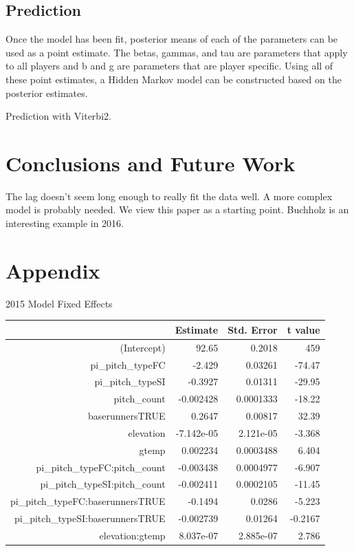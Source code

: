 \documentclass[letterpaper,12pt]{article}\usepackage[]{graphicx}\usepackage[]{color}
\begin{document}
\subsection{Prediction}
Once the model has been fit, posterior means of each of the parameters can be used as a point estimate.  The betas, gammas, and tau are parameters that apply to all players and b and g are parameters that are player specific.  Using all of these point estimates, a Hidden Markov model can be constructed based on the posterior estimates.  

Prediction with Viterbi2.  


\section{Conclusions and Future Work}
The lag doesn't seem long enough to really fit the data well.  A more complex model is probably needed.  We view this paper as a starting point.  Buchholz is an interesting example in 2016.  


\section*{Appendix}
2015 Model Fixed Effects
\begin{table}[ht]
\centering
\begin{tabular}{rrrr}
  \hline
 & Estimate & Std. Error & t value \\ 
  \hline
(Intercept) & 92.65 & 0.2018 &   459 \\ 
  pi\_pitch\_typeFC & -2.429 & 0.03261 & -74.47 \\ 
  pi\_pitch\_typeSI & -0.3927 & 0.01311 & -29.95 \\ 
  pitch\_count & -0.002428 & 0.0001333 & -18.22 \\ 
  baserunnersTRUE & 0.2647 & 0.00817 & 32.39 \\ 
  elevation & -7.142e-05 & 2.121e-05 & -3.368 \\ 
  gtemp & 0.002234 & 0.0003488 & 6.404 \\ 
  pi\_pitch\_typeFC:pitch\_count & -0.003438 & 0.0004977 & -6.907 \\ 
  pi\_pitch\_typeSI:pitch\_count & -0.002411 & 0.0002105 & -11.45 \\ 
  pi\_pitch\_typeFC:baserunnersTRUE & -0.1494 & 0.0286 & -5.223 \\ 
  pi\_pitch\_typeSI:baserunnersTRUE & -0.002739 & 0.01264 & -0.2167 \\ 
  elevation:gtemp & 8.037e-07 & 2.885e-07 & 2.786 \\ 
   \hline
\end{tabular}
\end{table}
\end{document}
